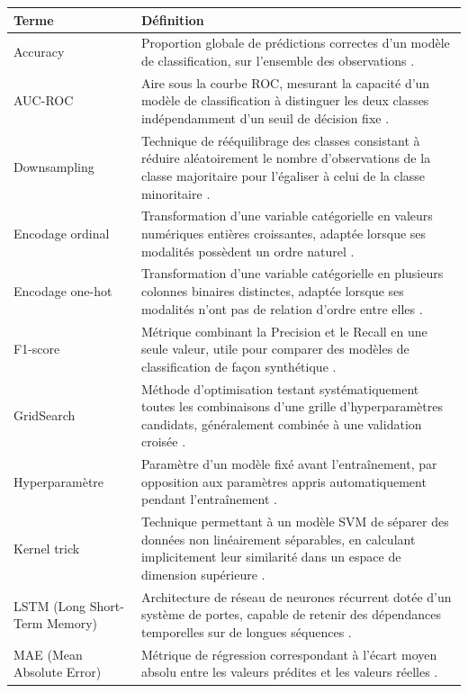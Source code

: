 \documentclass[a4paper,12pt, oneside]{article}
\begin{document}
\begin{longtable}{@{}p{4cm}p{13cm}@{}}
\textbf{Terme} & \textbf{Définition} \\
\midrule


Accuracy & Proportion globale de prédictions correctes d'un modèle de classification, sur l'ensemble des observations \cite{scikitlearn}. \\[24pt]
AUC-ROC & Aire sous la courbe ROC, mesurant la capacité d'un modèle de classification à distinguer les deux classes indépendamment d'un seuil de décision fixe \cite{scikitlearn}. \\[24pt]
Downsampling & Technique de rééquilibrage des classes consistant à réduire aléatoirement le nombre d'observations de la classe majoritaire pour l'égaliser à celui de la classe minoritaire \cite{imblearndoc}. \\[24pt]
Encodage ordinal & Transformation d'une variable catégorielle en valeurs numériques entières croissantes, adaptée lorsque ses modalités possèdent un ordre naturel \cite{scikitlearn}. \\[24pt]
Encodage one-hot & Transformation d'une variable catégorielle en plusieurs colonnes binaires distinctes, adaptée lorsque ses modalités n'ont pas de relation d'ordre entre elles \cite{scikitlearn}. \\[24pt]
F1-score & Métrique combinant la Precision et le Recall en une seule valeur, utile pour comparer des modèles de classification de façon synthétique \cite{scikitlearn}. \\[24pt]
GridSearch & Méthode d'optimisation testant systématiquement toutes les combinaisons d'une grille d'hyperparamètres candidats, généralement combinée à une validation croisée \cite{scikitlearn}. \\[24pt]
Hyperparamètre & Paramètre d'un modèle fixé avant l'entraînement, par opposition aux paramètres appris automatiquement pendant l'entraînement \cite{scikitlearn}. \\[24pt]
Kernel trick & Technique permettant à un modèle SVM de séparer des données non linéairement séparables, en calculant implicitement leur similarité dans un espace de dimension supérieure \cite{cortesvapnik1995}. \\[24pt]
LSTM (Long Short-Term Memory) & Architecture de réseau de neurones récurrent dotée d'un système de portes, capable de retenir des dépendances temporelles sur de longues séquences \cite{hochreiter1997}. \\[24pt]
MAE (Mean Absolute Error) & Métrique de régression correspondant à l'écart moyen absolu entre les valeurs prédites et les valeurs réelles \cite{scikitlearn}. \\[24pt]

\end{longtable}
\end{document}
